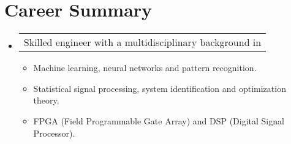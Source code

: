 \section{Career Summary}

\begin{itemize}[leftmargin=0.15in, label={}] %
    \item   \begin{tabular*}{0.2\textwidth}{l} Skilled engineer with a multidisciplinary background in \end{tabular*}\vspace{-7pt} %
            \begin{itemize} %
                \item{Machine learning, neural networks and pattern recognition. \vspace{-2pt}} %
                \item{Statistical signal processing, system identification and optimization theory. \vspace{-2pt}} %
                \item{FPGA (Field Programmable Gate Array) and DSP (Digital Signal Processor). \vspace{-2pt}} %
            \end{itemize}\vspace{-5pt}
\end{itemize} %
